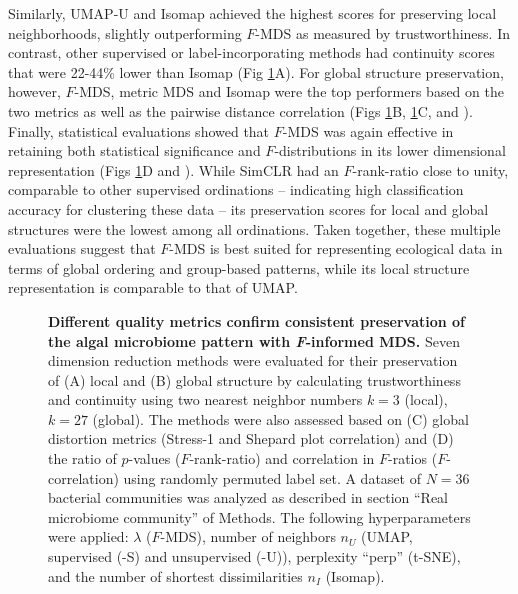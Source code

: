 \documentclass[10pt,letterpaper]{article}
\newcommand{\1}{{\rm 1}\kern-0.24em{\rm I}}
\begin{document}
Similarly, UMAP-U and Isomap achieved the highest scores for preserving local neighborhoods, slightly outperforming $F$-MDS as measured by trustworthiness. In contrast, other supervised or label-incorporating methods had continuity scores that were 22-44\% lower than Isomap (Fig \ref{fig:eval_real}A). For global structure preservation, however, $F$-MDS, metric MDS and Isomap were the top performers based on the two metrics as well as the pairwise distance correlation (Figs \ref{fig:eval_real}B, \ref{fig:eval_real}C, and ). Finally, statistical evaluations showed that $F$-MDS was again effective in retaining both statistical significance and $F$-distributions in its lower dimensional representation (Figs \ref{fig:eval_real}D and ). While SimCLR had an $F$-rank-ratio close to unity, comparable to other supervised ordinations – indicating high classification accuracy for clustering these data – its preservation scores for local and global structures were the lowest among all ordinations. Taken together, these multiple evaluations suggest that $F$-MDS is best suited for representing ecological data in terms of global ordering and group-based patterns, while its local structure representation is comparable to that of UMAP.


\begin{figure}[h!]
    \centering
    \caption{\textbf{Different quality metrics confirm consistent preservation of the algal microbiome pattern with \textit{F}-informed MDS.} Seven dimension reduction methods were evaluated for their preservation of (A) local and (B) global structure by calculating trustworthiness and continuity using two nearest neighbor numbers $k=3$ (local), $k=27$ (global). The methods were also assessed based on (C) global distortion metrics (Stress-1 and Shepard plot correlation) and (D) the ratio of $p$-values ($F$-rank-ratio) and correlation in $F$-ratios ($F$-correlation) using randomly permuted label set. A dataset of $N=36$ bacterial communities was analyzed as described in section ``Real microbiome community'' of Methods. The following hyperparameters were applied: $\lambda$ ($F$-MDS), number of neighbors $n_U$ (UMAP, supervised (-S) and unsupervised (-U)), perplexity ``perp'' (t-SNE), and the number of shortest dissimilarities $n_I$ (Isomap).}
    \label{fig:eval_real}
\end{figure}
\end{document}
